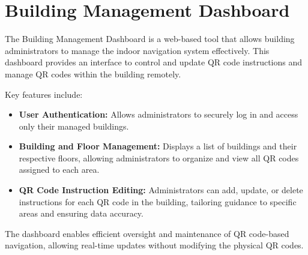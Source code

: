 \section{Building Management Dashboard}

The Building Management Dashboard is a web-based tool that allows building administrators to manage the indoor navigation system effectively. This dashboard provides an interface to control and update QR code instructions and manage QR codes within the building remotely.

Key features include:
\begin{itemize}
	\item \textbf{User Authentication:} Allows administrators to securely log in and access only their managed buildings.
	\item \textbf{Building and Floor Management:} Displays a list of buildings and their respective floors, allowing administrators to organize and view all QR codes assigned to each area.
	\item \textbf{QR Code Instruction Editing:} Administrators can add, update, or delete instructions for each QR code in the building, tailoring guidance to specific areas and ensuring data accuracy.
\end{itemize}


The dashboard enables efficient oversight and maintenance of QR code-based navigation, allowing real-time updates without modifying the physical QR codes.